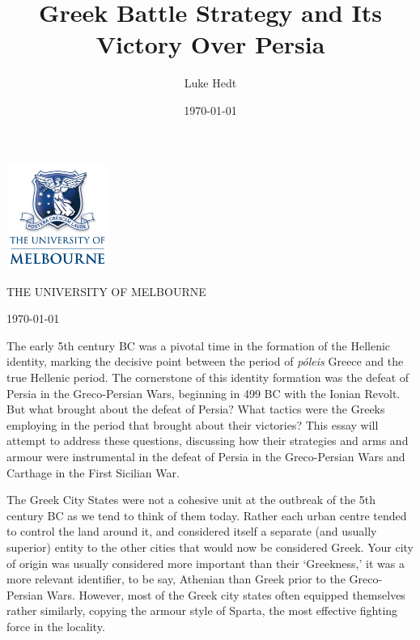 \documentclass[a4paper, 12pt]{article}
\title{Greek Battle Strategy and Its Victory Over Persia}
\author{Luke Hedt}
\date{\today}
\begin{document}
\begin{titlepage}
    \centering
    \includegraphics[width=0.25\textwidth]{UniLogo.png}\par\vspace{1cm}
    {\scshape\Large THE UNIVERSITY OF MELBOURNE \par}
    \vspace{1.5cm}
    {\Huge \thetitle \par}
    \vfill

    {\Large\itshape \theauthor \par}
    \vspace{1.5cm}
    {\Large \today\par}
\end{titlepage}
\pagestyle{plain}

The early 5th century BC was a pivotal time in the formation of the Hellenic
identity, marking the decisive point between the period of \emph{p{\'o}leis} Greece
and the true Hellenic period. The cornerstone of this identity formation
was the defeat of Persia in the Greco-Persian Wars, beginning in 499 BC
with the Ionian Revolt. But what brought about the defeat of Persia? What tactics
were the Greeks employing in the period that brought about their victories?
This essay will attempt to address these questions, discussing how their
strategies and arms and armour were instrumental in the defeat of Persia
in the Greco-Persian Wars and
Carthage in the First Sicilian War.

\vspace{1em} \par

The Greek City States were not a cohesive unit at the outbreak of the 5th century
BC as we tend to think of them today. Rather each urban centre tended to control
the land around it, and considered itself a separate (and usually superior)
entity to the other cities that would now be considered Greek. Your city of
origin was usually considered more important than their `Greekness,' it was
a more relevant identifier, to be say, Athenian than Greek prior to the
Greco-Persian Wars. However, most of the Greek city states often equipped
themselves rather similarly, copying the armour style of Sparta, the most
effective fighting force in the locality.


\nocite{*}
\newpage
\printbibliography
\end{document}
